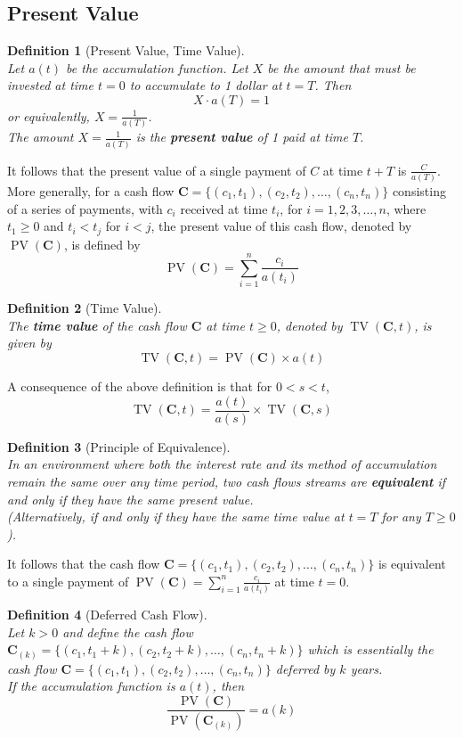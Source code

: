 \documentclass[11pt]{article}
\newtheorem{definition}{Definition}[section]
\theoremstyle{definition}
\DeclareMathOperator{\PV}{PV}
\DeclareMathOperator{\TV}{TV}
\newcommand\cf[1]{\mathbf{#1}}
\begin{document}
\subsection{Present Value}
\begin{definition}[Present Value, Time Value]
\hfill\\\normalfont Let $a(t)$ be the accumulation function. Let $X$ be the amount that must be invested at time $t=0$ to accumulate to 1 dollar at $t=T$. Then
\[
X\cdot a(T)=1
\]
or equivalently, $X= \frac{1}{a(T)}$.\\
The amount $X=\frac{1}{a(T)}$ is the \textbf{present value} of 1 paid at time $T$.
\end{definition}
It follows that the present value of a single payment of $C$ at time $t+T$ is $\frac{C}{a(T)}$.\\
More generally, for a cash flow $\cf{C} = \{(c_1,t_1),(c_2,t_2),\ldots,(c_n,t_n)\}$ consisting of a series of payments, with $c_i$ received at time $t_i$, for $i = 1,2 ,3,\ldots, n$, where $t_1\geq 0$ and $t_i<t_j$ for $i<j$, the present value of this cash flow, denoted by $\PV(\cf{C})$, is defined by
\[
\PV(\cf{C})=\sum_{i=1}^n\frac{c_i}{a(t_i)}
\] 
\begin{definition}[Time Value]
\hfill\\\normalfont The \textbf{time value} of the cash flow $\cf{C}$ at time $t\geq 0$, denoted by $\TV(\cf{C},t)$, is given by
\[
\TV(\cf{C},t) = \PV(\cf{C})\times a(t)
\]
\end{definition}
A consequence of the above definition is that for $0<s<t$,
\[
\TV(\cf{C},t)=\frac{a(t)}{a(s)}\times\TV(\cf{C},s)
\]
\begin{definition}[Principle of Equivalence]
\hfill\\\normalfont In an environment where both the \textit{interest rate} and its \textit{method of accumulation} remain the same over any time period, two cash flows streams are \textbf{equivalent} if and only if they have the same present value.\\(Alternatively, if and only if they have the same time value at $t=T$ for any $T\geq 0$).
\end{definition}
It follows that the cash flow $\cf{C}=\{(c_1,t_1),(c_2,t_2),\ldots,(c_n,t_n)\}$ is equivalent to a single payment of $\PV(\cf{C})=\sum_{i=1}^n\frac{c_i}{a(t_i)}$ at time $t=0$.
\begin{definition}[Deferred Cash Flow]
\hfill\\\normalfont Let $k>0$ and define the cash flow $\cf{C}_{(k)}=\{(c_1,t_1+k),(c_2,t_2+k),\ldots,(c_n,t_n+k)\}$ which is essentially the cash flow $\cf{C} = \{(c_1,t_1),(c_2,t_2),\ldots,(c_n,t_n)\}$ deferred by $k$ years.\\
If the accumulation function is $a(t)$, then
\[
\frac{\PV(\cf{C})}{\PV(\cf{C}_{(k)})}=a(k)
\]
\end{definition}
\end{document}
